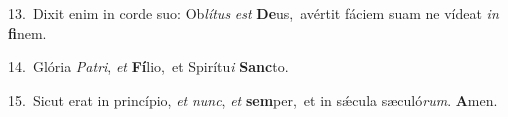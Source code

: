 {\numbfont\textcolor{\numbcolor}{13.}}~Dixit enim in corde suo: Ob\-\textit{lí}\-\textit{tus} \textit{est} \textbf{De}\-us,~\star avértit fáciem suam ne vídeat \textit{in} \textbf{fi}\-nem.\par
{\numbfont\textcolor{\numbcolor}{14.}}~Glória \textit{Pa}\-\textit{tri}, \textit{et} \textbf{Fí}\-lio,~\star et Spirítu\textit{i} \textbf{Sanc}\-to.\par
{\numbfont\textcolor{\numbcolor}{15.}}~Sicut erat in princípio, \textit{et} \textit{nunc}\-, \textit{et} \textbf{sem}\-per,~\star et in sǽcula sæculó\-\textit{rum}\-. \textbf{A}\-men.\par
